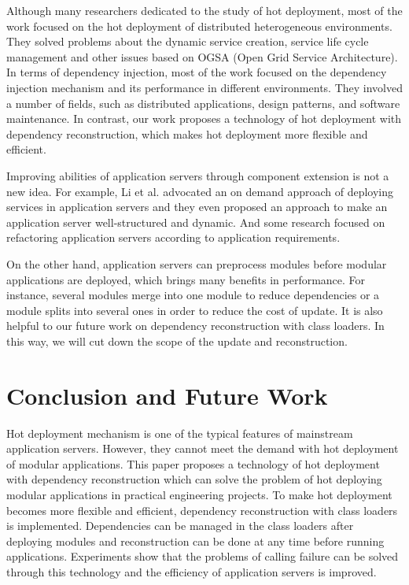 \documentclass[conference]{IEEEtran}
\begin{document}
Although many researchers dedicated to the study of hot deployment, most of the work focused on the hot deployment of distributed heterogeneous environments\cite{related_hot_1, related_hot_2, related_hot_3, related_hot_4}.
They solved problems about the dynamic service creation, service life cycle management and other issues based on OGSA (Open Grid Service Architecture).
In terms of dependency injection, most of the work focused on the dependency injection mechanism and its performance in different environments\cite{related_DI_1, related_DI_2, related_DI_3}.
They involved a number of fields, such as distributed applications, design patterns, and software maintenance.
In contrast, our work proposes a technology of hot deployment with dependency reconstruction, which makes hot deployment more flexible and efficient.

Improving abilities of application servers through component extension is not a new idea.
For example, Li et al. advocated an on demand approach of deploying services in application servers\cite{related_AS_1} and they even proposed an approach to make an application server well-structured and dynamic\cite{related_AS_2}.
And some research focused on refactoring application servers according to application requirements\cite{related_AS_3}.
	
On the other hand, application servers can preprocess modules before modular applications are deployed, which brings many benefits in performance. 
For instance, several modules merge into one module to reduce dependencies\cite{related_merge} or a module splits into several ones in order to reduce the cost of update\cite{related_split}.
It is also helpful to our future work on dependency reconstruction with class loaders.
In this way, we will cut down the scope of the update and reconstruction.


\section{Conclusion and Future Work\label{sec:conclusion}}
Hot deployment mechanism is one of the typical features of mainstream application servers.
However, they cannot meet the demand with hot deployment of modular applications.
This paper proposes a technology of hot deployment with dependency reconstruction which can solve the problem of hot deploying modular applications in practical engineering projects.
To make hot deployment becomes more flexible and efficient, dependency reconstruction with class loaders is implemented.
Dependencies can be managed in the class loaders after deploying modules and reconstruction can be done at any time before running applications. 
Experiments show that the problems of calling failure can be solved through this technology and the efficiency of application servers is improved.
\end{document}
